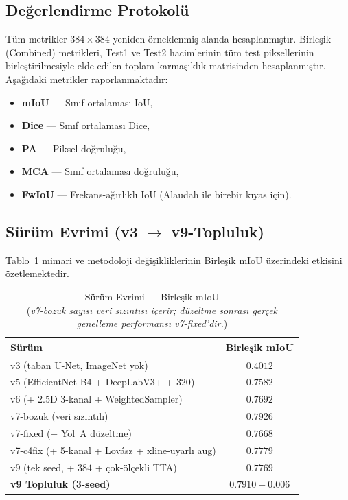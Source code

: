 \documentclass[conference,a4paper,10pt]{IEEEtran}
\begin{document}
\subsection{Değerlendirme Protokolü}

Tüm metrikler $384 \times 384$ yeniden örneklenmiş alanda hesaplanmıştır.
Birleşik (Combined) metrikleri, Test1 ve Test2 hacimlerinin tüm test piksellerinin
birleştirilmesiyle elde edilen toplam karmaşıklık matrisinden hesaplanmıştır.
Aşağıdaki metrikler raporlanmaktadır:
\begin{itemize}
\item \textbf{mIoU} --- Sınıf ortalaması IoU,
\item \textbf{Dice} --- Sınıf ortalaması Dice,
\item \textbf{PA} --- Piksel doğruluğu,
\item \textbf{MCA} --- Sınıf ortalaması doğruluğu,
\item \textbf{FwIoU} --- Frekans-ağırlıklı IoU (Alaudah ile birebir kıyas için).
\end{itemize}

\subsection{Sürüm Evrimi (v3 $\rightarrow$ v9-Topluluk)}

Tablo~\ref{tab:surum_evolusyon} mimari ve metodoloji değişikliklerinin
Birleşik mIoU üzerindeki etkisini özetlemektedir.

\begin{table}[!t]
\renewcommand{\arraystretch}{1.2}
\caption{Sürüm Evrimi --- Birleşik mIoU \\ (\textit{v7-bozuk sayısı veri sızıntısı içerir; düzeltme sonrası gerçek genelleme performansı v7-fixed'dir.})}
\label{tab:surum_evolusyon}
\centering
\begin{tabular}{lc}
\toprule
\textbf{Sürüm} & \textbf{Birleşik mIoU} \\
\midrule
v3 (taban U-Net, ImageNet yok)        & $0.4012$ \\
v5 (EfficientNet-B4 + DeepLabV3+ + $320$) & $0.7582$ \\
v6 (+ 2.5D 3-kanal + WeightedSampler)  & $0.7692$ \\
\rowcolor{red!10}
v7-bozuk (veri sızıntılı)              & $0.7926$ \\
v7-fixed (+ Yol~A düzeltme)            & $0.7668$ \\
v7-c4fix (+ 5-kanal + Lov\'asz + xline-uyarlı aug) & $0.7779$ \\
v9 (tek seed, + $384$ + çok-ölçekli TTA) & $0.7769$ \\
\rowcolor{green!10}
\textbf{v9 Topluluk (3-seed)}          & $\mathbf{0.7910 \pm 0.006}$ \\
\bottomrule
\end{tabular}
\end{table}
\end{document}
